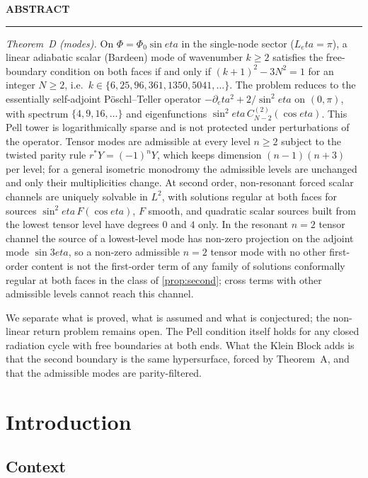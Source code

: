 \documentclass[11pt]{article}
\theoremstyle{canonmath}
\theoremstyle{canonpostulate}
\theoremstyle{canonproposition}
\theoremstyle{canonmath}
\theoremstyle{canonproposition}
\def\eta{eta}%
\newenvironment{CanonAbstract}{%
  \begin{center}
  {\sffamily\footnotesize\bfseries\color{seriesMuted}\MakeUppercase{Abstract}}\\[-0.05em]
  {\color{seriesAccent}\rule{0.16\textwidth}{0.75pt}}
  \end{center}
  \begin{tcolorbox}[
    enhanced,
    breakable,
    colback=white,
    colframe=seriesRule,
    boxrule=0.4pt,
    leftrule=2.2pt,
    arc=1pt,
    left=12pt,right=12pt,top=9pt,bottom=9pt,
    before skip=5pt,after skip=4pt
  ]
  \small
}{%
  \end{tcolorbox}
}
\begin{document}
\begin{CanonAbstract}
\emph{Theorem~D (modes).} On $\Phi = \Phi_0\sin\eta$ in the single-node sector ($L_\eta=\pi$), a linear adiabatic scalar (Bardeen) mode of wavenumber $k\ge2$ satisfies the free-boundary condition on both faces if and only if $(k+1)^2 - 3N^2 = 1$ for an integer $N\ge2$, i.e.\ $k \in \{6, 25, 96, 361, 1350, 5041, \dots\}$. The problem reduces to the essentially self-adjoint Pöschl--Teller operator $-\partial_\eta^2 + 2/\sin^2\eta$ on $(0,\pi)$, with spectrum $\{4, 9, 16, \dots\}$ and eigenfunctions $\sin^2\eta\,C^{(2)}_{N-2}(\cos\eta)$. This Pell tower is logarithmically sparse and is not protected under perturbations of the operator. Tensor modes are admissible at every level $n\ge2$ subject to the twisted parity rule $r^*Y = (-1)^nY$, which keeps dimension $(n-1)(n+3)$ per level; for a general isometric monodromy the admissible levels are unchanged and only their multiplicities change. At second order, non-resonant forced scalar channels are uniquely solvable in $L^2$, with solutions regular at both faces for sources $\sin^2\eta\,F(\cos\eta)$, $F$ smooth, and quadratic scalar sources built from the lowest tensor level have degrees $0$ and $4$ only. In the resonant $n=2$ tensor channel the source of a lowest-level mode has non-zero projection on the adjoint mode $\sin3\eta$, so a non-zero admissible $n=2$ tensor mode with no other first-order content is not the first-order term of any family of solutions conformally regular at both faces in the class of \cref{prop:second}; cross terms with other admissible levels cannot reach this channel.

We separate what is proved, what is assumed and what is conjectured; the non-linear return problem remains open. The Pell condition itself holds for any closed radiation cycle with free boundaries at both ends. What the Klein Block adds is that the second boundary is the same hypersurface, forced by Theorem~A, and that the admissible modes are parity-filtered.
\end{CanonAbstract}

\newpage
{}
\tableofcontents

\newpage
{}
\setcounter{page}{1}

\section{Introduction}
\label{sec:intro}

\subsection*{Context}
\end{document}
